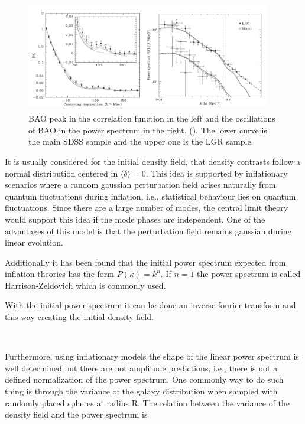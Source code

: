 \begin{figure}[htbp]
       \centering
               \includegraphics[width=0.95\textwidth]{./Images/chapter2/PS_CF.png}
       \caption{\small BAO peak in the correlation function in the left and the oscillations of BAO in the power spectrum in the right,
       (\cite{PLOT}).  
       The lower curve is the main SDSS sample and the upper one is the LGR sample. }
       \label{ps_cf}
 \end{figure}

It is usually considered for the initial density field, that density contrasts 
follow a normal distribution centered in $\langle \delta \rangle = 0$. This idea is supported by
inflationary scenarios where a random gaussian perturbation field arises naturally from quantum 
fluctuations during inflation, i.e., statistical behaviour lies on quantum fluctuations. 
Since there are a large number of modes, the central limit theory 
would support this idea if the mode phases are independent. 
One of the advantages of this model is that the perturbation field remains gaussian during linear evolution. 

Additionally it has been found that the initial power spectrum expected from inflation theories 
has the form $P(\kappa)= k^n$. If $n=1$ the power spectrum is called Harrison-Zeldovich which is 
commonly used. 

With the initial power spectrum it can be done an inverse fourier transform and this way creating the initial density field. 

\

Furthermore, using inflationary models the shape of the linear power spectrum is well 
determined but there are not amplitude predictions, i.e., there is not a defined 
normalization of the power spectrum. 
One commonly way to do such thing is through the variance of the galaxy distribution when
sampled with randomly placed spheres at radius R. The relation between the variance of the 
density field and the power spectrum is

